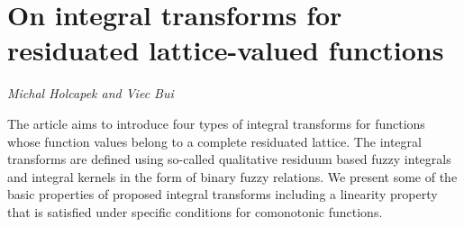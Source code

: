 \documentclass[../booklet.tex]{subfiles}
\begin{document}
\section[On integral transforms for residuated lattice-valued functions. {\it Michal Holcapek and Viec Bui}]{On integral transforms for residuated lattice-valued functions}
 

\begin{center}
  {\it Michal Holcapek and Viec Bui}
\end{center}

\vskip 0.8cm


The article aims to introduce four types of integral transforms for functions whose function values belong to a complete residuated lattice. The integral transforms are defined using so-called qualitative residuum based fuzzy integrals and integral kernels in the form of binary fuzzy relations. We present some of the basic properties of proposed integral transforms including a linearity property that is satisfied under specific conditions for comonotonic functions. 

\end{document}
